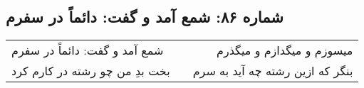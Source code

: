 \begin{center}
\section*{شماره ۸۶: شمع آمد و گفت: دائماً در سفرم}
\label{sec:086}
\begin{longtable}{l p{0.5cm} r}
شمع آمد و گفت: دائماً در سفرم
&&
میسوزم و میگدازم و میگذرم
\\
بخت بدِ من چو رشته در کارم کرد
&&
بنگر که ازین رشته چه آید به سرم
\\
\end{longtable}
\end{center}
